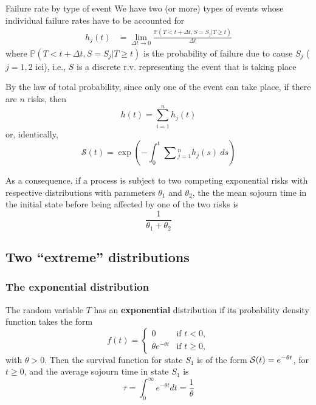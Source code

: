\documentclass[aspectratio=169]{beamer}\usepackage[]{graphicx}\usepackage[]{xcolor}
\begin{document}
\begin{frame}{Failure rate by type of event}
We have two (or more) types of events whose individual failure rates have to be accounted for
\begin{align*}
h_j(t) &= \lim_{\Delta t\to 0} \frac{\mathbb{P}( T<t+\Delta t, S=S_j | T\geq t)}{\Delta t} 
\end{align*}
where $\mathbb{P}(T<t+\Delta t, S=S_j | T\geq t)$ is the probability of failure due to cause $S_j$ ($j=1,2$ ici), i.e., $S$ is a discrete r.v. representing the event that is taking place
\end{frame}

\begin{frame}
By the law of total probability, since only one of the event can take place, if there are $n$ risks, then
$$
h(t) = \sum_{i=1}^n h_j(t)
$$
or, identically,
$$
\mathcal{S}(t)
=
\exp\left(
  -\int_0^t \sum\textstyle_{j=1}^n h_j(s)\ ds
\right)
$$
\end{frame}

\begin{frame}
As a consequence, if a process is subject to two competing exponential risks with respective distributions with parameters $\theta_1$ and $\theta_2$, the the mean sojourn time in the initial state before being affected by one of the two risks is
$$
\frac{1}{\theta_1+\theta_2}
$$
\end{frame}


\subsection{Two ``extreme'' distributions}

\begin{frame}\frametitle{The exponential distribution}
The random variable $T$ has an \textbf{exponential} distribution if its
probability density function takes the form
\begin{equation}\label{eq:exp_distrib}
f(t)=\begin{cases}0&\textrm{if }t<0,\\
\theta e^{-\theta t}&\textrm{if }t\geq 0,
\end{cases}
\end{equation}
with $\theta>0$. Then the
survival function for state $S_1$ is of the form $\S(t)=e^{-\theta
  t}$, for $t\geq 0$, and the average sojourn time in state $S_1$ is
\[
\tau=\int_0^\infty e^{-\theta t}dt=\frac 1\theta
\]
\end{frame}
\end{document}
